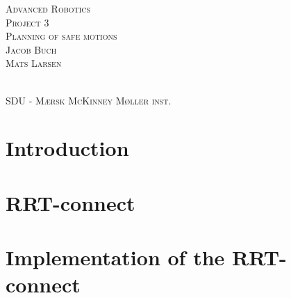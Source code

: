 



%

\begin{titlingpage}

\begin{center}
\vspace*{5\onelineskip}
\vspace*{5\onelineskip}
{ \baselineskip=24pt
{\Huge \textsc{Advanced Robotics}}\\
\vspace*{2\onelineskip}
{\large \textsc{Project 3}}\\
{\large \textsc{Planning of safe motions
}}\\
\vspace*{4\onelineskip}
\large\textsc{Jacob Buch}\\
\large\textsc{Mats Larsen}\par}
\vfill
\vfill

\vspace*{2\onelineskip}
 \quad \hfill
{}
\vspace{2\onelineskip} \\
\small
\textsc{SDU - M\ae rsk McKinney M\o ller inst.}\\
\end{center}
\end{titlingpage}
\tableofcontents*

\chapter{Introduction}

\chapter{RRT-connect}
 \label{chapter:rrtconnect}
\chapter{Implementation of the RRT-connect}

